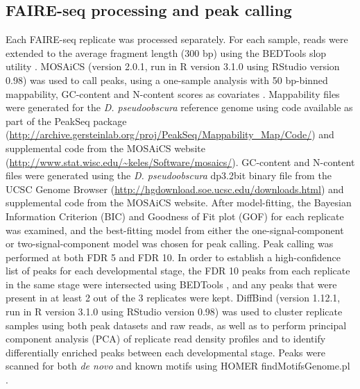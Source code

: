 \subsection{FAIRE-seq processing and peak calling}
Each FAIRE-seq replicate was processed separately. For each sample, reads were extended to the average fragment length (300 bp) using the BEDTools slop utility \citep{quinlan_bedtools:_2010}. MOSAiCS (version 2.0.1, run in R version 3.1.0 using RStudio version 0.98) was used to call peaks, using a one-sample analysis with 50 bp-binned mappability, GC-content and N-content scores as covariates \citep{chung_mosaics_2012}. Mappability files were generated for the \emph{D. pseudoobscura} reference genome using code available as part of the PeakSeq package (\url{http://archive.gersteinlab.org/proj/PeakSeq/Mappability_Map/Code/}) \citep{rozowsky_peakseq_2009} and supplemental code from the MOSAiCS website (\url{http://www.stat.wisc.edu/~keles/Software/mosaics/}). GC-content and N-content files were generated using the \emph{D. pseudoobscura} dp3.2bit binary file from the UCSC Genome Browser (\url{http://hgdownload.soe.ucsc.edu/downloads.html}) and supplemental code from the MOSAiCS website. After model-fitting, the Bayesian Information Criterion (BIC) and Goodness of Fit plot (GOF) for each replicate was examined, and the best-fitting model from either the one-signal-component or two-signal-component model was chosen for peak calling. Peak calling was performed at both FDR 5 and FDR 10. In order to establish a high-confidence list of peaks for each developmental stage, the FDR 10 peaks from each replicate in the same stage were intersected using BEDTools \citep{quinlan_bedtools:_2010}, and any peaks that were present in at least 2 out of the 3 replicates were kept. DiffBind (version 1.12.1, run in R version 3.1.0 using RStudio version 0.98) was used to cluster replicate samples using both peak datasets and raw reads, as well as to perform principal component analysis (PCA) of replicate read density profiles and to identify differentially enriched peaks between each developmental stage. Peaks were scanned for both \emph{de novo} and known motifs using HOMER findMotifsGenome.pl \citep{heinz_simple_2010}.

